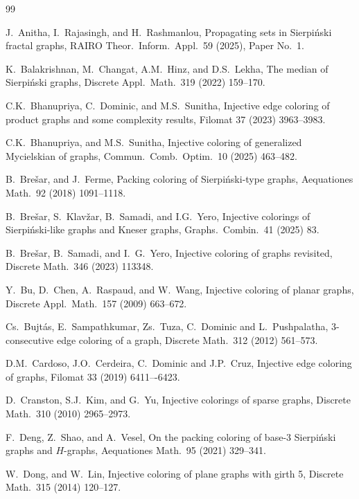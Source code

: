\documentclass{article}
\begin{document}
\begin{thebibliography}{99}

J.~Anitha, I.~Rajasingh, and H.~Rashmanlou, 
Propagating sets in Sierpi\'{n}ski fractal graphs,
RAIRO Theor.\ Inform.\ Appl.\ 59 (2025), Paper No.\ 1.

K.~Balakrishnan, M.~Changat, A.M.~Hinz, and D.S.~Lekha, 
The median of {S}ierpi\'nski graphs,
Discrete Appl.\ Math.\ 319 (2022) 159--170. 

  C.K.~Bhanupriya, C.~Dominic, and M.S.~Sunitha, Injective edge coloring of product graphs and some complexity results, Filomat 37 (2023) 3963--3983.

 C.K.~Bhanupriya, and M.S.~Sunitha, Injective coloring of generalized Mycielskian of graphs,  Commun.\ Comb.\ Optim.\ 10 (2025) 463--482.

  B.~Bre\v sar, and J.~Ferme,
 Packing coloring of Sierpi\'{n}ski-type graphs,
 Aequationes Math.\ 92 (2018) 1091--1118.
 
 B.~Bre\v{s}ar, S.~Klav\v{z}ar, B.~Samadi, and I.G.~Yero, Injective colorings of Sierpi\'nski-like graphs and Kneser graphs,
Graphs.\ Combin.\ 41 (2025) 83.

 B.~Bre\v{s}ar, B.~Samadi, and I.~G.~Yero, Injective coloring of graphs 
revisited, Discrete Math.\ 346 (2023) 113348.


 Y.~Bu, D.~Chen, A.~Raspaud, and W.~Wang, Injective coloring of planar graphs, Discrete Appl.\ Math.\ 157 (2009) 663--672.

 Cs.~Bujt\'{a}s, E.~Sampathkumar, Zs.~Tuza, C.~Dominic and L.~Pushpalatha, $3$-consecutive edge coloring of a graph, Discrete Math.\ 312 (2012) 561--573.

 D.M.~Cardoso, J.O.~Cerdeira, C.~Dominic and J.P.~Cruz, Injective edge coloring of graphs, Filomat 33 (2019) 6411–-6423.

 D.~Cranston, S.J.~Kim, and G.~Yu,  Injective colorings of sparse graphs, Discrete Math.\ 310 (2010) 2965--2973.

F.~Deng, Z.~Shao, and A.~Vesel, 
 On the packing coloring of base-$3$ {S}ierpi\'nski graphs and {$H$}-graphs, Aequationes Math.\  95 (2021) 329--341. 

 W.~Dong, and W.~Lin, Injective coloring of plane graphs with girth 5,
Discrete Math.\ 315 (2014) 120--127.


\end{thebibliography}
\end{document}
